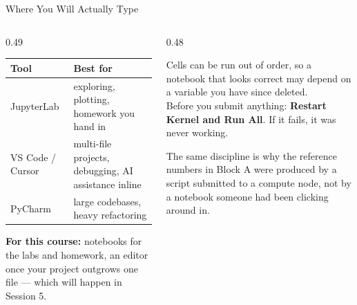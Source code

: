 \begin{frame}{Where You Will Actually Type}
\begin{columns}[T]
\begin{column}{0.49\textwidth}
\small
\begin{center}\footnotesize
\begin{tabularx}{\linewidth}{@{}>{\raggedright\arraybackslash}p{1.8cm} >{\raggedright\arraybackslash}X@{}}
\toprule
\textbf{Tool} & \textbf{Best for} \\
\midrule
JupyterLab & exploring, plotting, homework you hand in \\
VS Code / Cursor & multi-file projects, debugging, AI assistance inline \\
PyCharm & large codebases, heavy refactoring \\
\bottomrule
\end{tabularx}
\end{center}
\medskip
\footnotesize
\textbf{For this course:} notebooks for the labs and homework, an editor once your project outgrows one file --- which will happen in Session 5.
\end{column}
\begin{column}{0.48\textwidth}
\begin{cautionbox}[title=\textbf{A notebook is not a program}]\footnotesize
Cells can be run out of order, so a notebook that looks correct may depend on a variable you have since deleted.\\[1mm]
Before you submit anything: \textbf{Restart Kernel and Run All}. If it fails, it was never working.
\end{cautionbox}
\medskip
\begin{examplebox}\footnotesize
The same discipline is why the reference numbers in Block A were produced by a script submitted to a compute node, not by a notebook someone had been clicking around in.
\end{examplebox}
\end{column}
\end{columns}
\vspace{1mm}
\end{frame}

